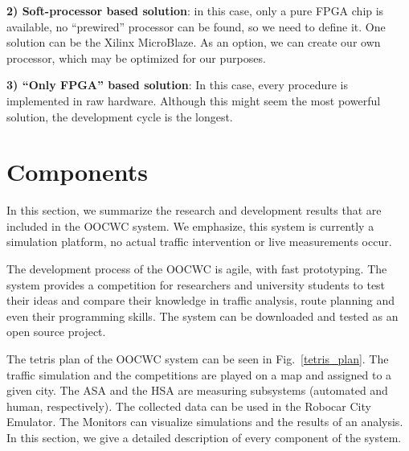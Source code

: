 \documentclass[b5paper,12pt]{report}
\theoremstyle{definition}
\begin{document}
{\bf{2) Soft-processor based solution}}: in this case, only a pure FPGA chip is available, no \enquote{prewired} processor can be found, so we need to define it. One solution can be the Xilinx MicroBlaze. As an option, we can create our own processor, which may be optimized for our purposes.

{\bf{3) \enquote{Only FPGA} based solution}}: In this case, every procedure is implemented in raw hardware. Although this might seem the most powerful solution, the development cycle is the longest.

\section{Components}
\label{components
}
In this section, we summarize the research and development results that are included in the OOCWC system. We emphasize, this system is currently a simulation platform, no actual traffic intervention or live measurements occur.

The development process of the OOCWC is agile, with fast prototyping. The system provides a competition for researchers and university students to test their ideas and compare their knowledge in traffic analysis, route planning and even their programming skills. The system can be downloaded and tested as an open source project. \cite{csts-repo}

The tetris plan of the OOCWC system can be seen in Fig.~\ref{tetris_plan}. The traffic simulation and the competitions are played on a map and assigned to a given city. The ASA and the HSA are measuring subsystems (automated and human, respectively). The collected data can be used in the Robocar City Emulator. The Monitors can visualize simulations and the results of an analysis. In this section, we give a detailed description of every component of the system.
\end{document}
